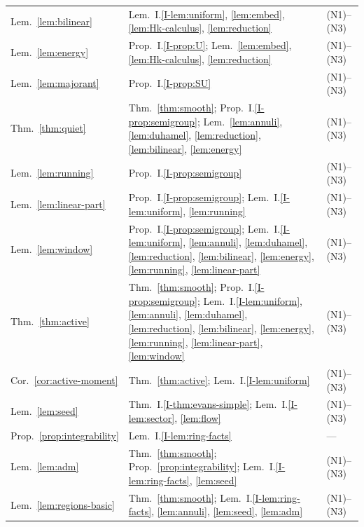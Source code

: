 \begin{longtable}{p{}p{}p{}}
\raggedright Lem.~\ref{lem:bilinear}
  & \raggedright Lem.~I.\ref{I-lem:uniform}, \ref{lem:embed}, \ref{lem:Hk-calculus}, \ref{lem:reduction} & (N1)--(N3) \\
\raggedright Lem.~\ref{lem:energy}
  & \raggedright Prop.~I.\ref{I-prop:U}; Lem.~\ref{lem:embed}, \ref{lem:Hk-calculus}, \ref{lem:reduction} & (N1)--(N3) \\
\raggedright Lem.~\ref{lem:majorant}
  & \raggedright Prop.~I.\ref{I-prop:SU} & (N1)--(N3) \\
\raggedright Thm.~\ref{thm:quiet}
  & \raggedright Thm.~\ref{thm:smooth}; Prop.~I.\ref{I-prop:semigroup}; Lem.~\ref{lem:annuli}, \ref{lem:duhamel}, \ref{lem:reduction}, \ref{lem:bilinear}, \ref{lem:energy} & (N1)--(N3) \\
\raggedright Lem.~\ref{lem:running}
  & \raggedright Prop.~I.\ref{I-prop:semigroup} & (N1)--(N3) \\
\raggedright Lem.~\ref{lem:linear-part}
  & \raggedright Prop.~I.\ref{I-prop:semigroup}; Lem.~I.\ref{I-lem:uniform}, \ref{lem:running} & (N1)--(N3) \\
\raggedright Lem.~\ref{lem:window}
  & \raggedright Prop.~I.\ref{I-prop:semigroup}; Lem.~I.\ref{I-lem:uniform}, \ref{lem:annuli}, \ref{lem:duhamel}, \ref{lem:reduction}, \ref{lem:bilinear}, \ref{lem:energy}, \ref{lem:running}, \ref{lem:linear-part} & (N1)--(N3) \\
\raggedright Thm.~\ref{thm:active}
  & \raggedright Thm.~\ref{thm:smooth}; Prop.~I.\ref{I-prop:semigroup}; Lem.~I.\ref{I-lem:uniform}, \ref{lem:annuli}, \ref{lem:duhamel}, \ref{lem:reduction}, \ref{lem:bilinear}, \ref{lem:energy}, \ref{lem:running}, \ref{lem:linear-part}, \ref{lem:window} & (N1)--(N3) \\
\raggedright Cor.~\ref{cor:active-moment}
  & \raggedright Thm.~\ref{thm:active}; Lem.~I.\ref{I-lem:uniform} & (N1)--(N3) \\
\raggedright Lem.~\ref{lem:seed}
  & \raggedright Thm.~I.\ref{I-thm:evans-simple}; Lem.~I.\ref{I-lem:sector}, \ref{lem:flow} & (N1)--(N3) \\
\raggedright Prop.~\ref{prop:integrability}
  & \raggedright Lem.~I.\ref{I-lem:ring-facts} & --- \\
\raggedright Lem.~\ref{lem:adm}
  & \raggedright Thm.~\ref{thm:smooth}; Prop.~\ref{prop:integrability}; Lem.~I.\ref{I-lem:ring-facts}, \ref{lem:seed} & (N1)--(N3) \\
\raggedright Lem.~\ref{lem:regions-basic}
  & \raggedright Thm.~\ref{thm:smooth}; Lem.~I.\ref{I-lem:ring-facts}, \ref{lem:annuli}, \ref{lem:seed}, \ref{lem:adm} & (N1)--(N3) \\

\end{longtable}
